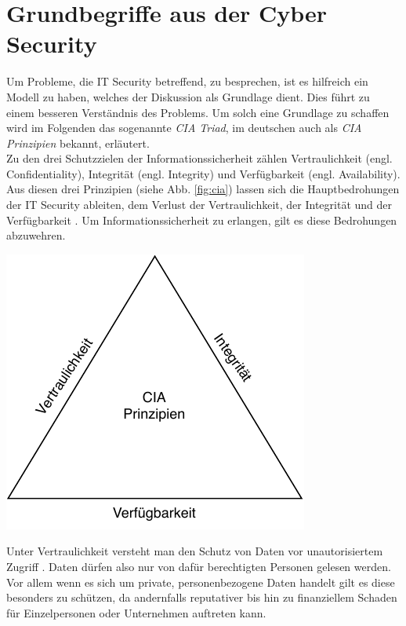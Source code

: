 \documentclass[
    12pt, %
    DIV10,
    ngerman, %
    a4paper, %
    oneside, %
    titlepage, %
    parskip=half, %
    headings=normal, %
    listof=totoc, %
    bibliography=totoc, %
    index=totoc, %
    captions=tableheading, %
    final %
]{scrreprt}
\begin{document}
\section{Grundbegriffe aus der Cyber Security}
Um Probleme, die IT Security betreffend, zu besprechen, ist es hilfreich ein Modell zu haben, welches der Diskussion als Grundlage  dient. Dies führt zu einem besseren Verständnis des Problems. Um solch eine Grundlage zu schaffen wird im Folgenden das sogenannte \emph{CIA Triad}, im deutschen auch als \emph{CIA Prinzipien} bekannt, erläutert.\\
Zu den drei Schutzzielen der Informationssicherheit zählen Vertraulichkeit (engl. Confidentiality), Integrität (engl. Integrity) und Verfügbarkeit (engl. Availability). Aus diesen drei Prinzipien (siehe Abb. \ref{fig:cia}) lassen sich die Hauptbedrohungen der IT Security ableiten, dem Verlust der Vertraulichkeit, der Integrität und der Verfügbarkeit \parencite{Andress2019}.
Um Informationssicherheit zu erlangen, gilt es diese Bedrohungen abzuwehren.
\begin{center}
\includegraphics[scale=0.8]{img/cia.pdf}
\label{fig:cia}
\end{center}
Unter Vertraulichkeit versteht man den Schutz von Daten vor unautorisiertem Zugriff \parencite{ingeno2018software}. Daten dürfen also nur von dafür berechtigten Personen gelesen werden. Vor allem wenn es sich um private, personenbezogene Daten handelt gilt es diese besonders zu schützen, da andernfalls reputativer bis hin zu finanziellem Schaden für Einzelpersonen oder Unternehmen auftreten kann.\\
\end{document}
